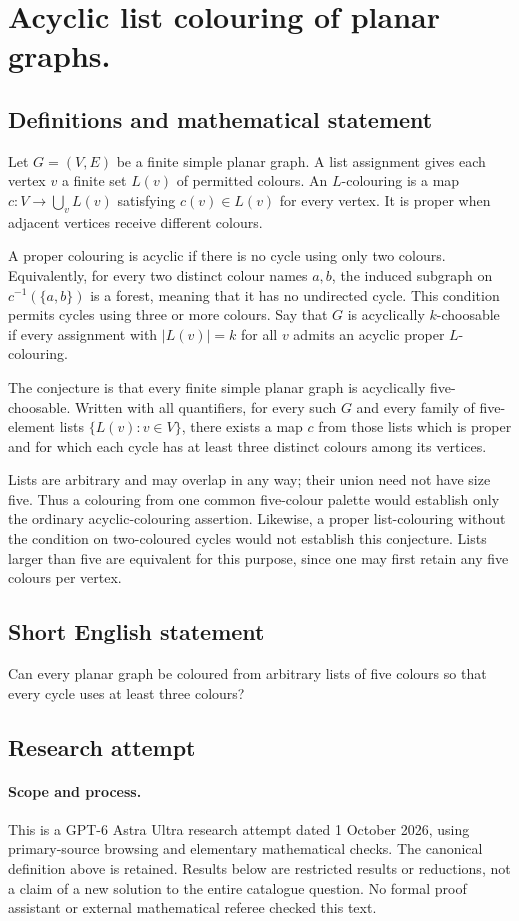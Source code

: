 \documentclass[11pt,a4paper]{article}
\begin{document}
\section*{Acyclic list colouring of planar graphs.}\label{statement}

\subsection{Definitions and mathematical statement}
Let $G=(V,E)$ be a finite simple planar graph. A list assignment gives each
vertex $v$ a finite set $L(v)$ of permitted colours. An $L$-colouring is a
map $c:V\to\bigcup_vL(v)$ satisfying $c(v)\in L(v)$ for every vertex.
It is proper when adjacent vertices receive different colours.

A proper colouring is acyclic if there is no cycle using only two colours.
Equivalently, for every two distinct colour names $a,b$, the induced
subgraph on $c^{-1}(\{a,b\})$ is a forest, meaning that it has no
undirected cycle. This condition permits cycles using three or more
colours. Say that $G$ is acyclically $k$-choosable if every assignment with
$|L(v)|=k$ for all $v$ admits an acyclic proper $L$-colouring.

The conjecture is that every finite simple planar graph is acyclically
five-choosable. Written with all quantifiers, for every such $G$ and every
family of five-element lists $\{L(v):v\in V\}$, there exists a map $c$
from those lists which is proper and for which each cycle has at least
three distinct colours among its vertices.

Lists are arbitrary and may overlap in any way; their union need not
have size five. Thus a colouring from one common five-colour palette
would establish only the ordinary acyclic-colouring assertion. Likewise,
a proper list-colouring without the condition on two-coloured cycles
would not establish this conjecture. Lists larger than five are equivalent
for this purpose, since one may first retain any five colours per vertex.
\subsection{Short English statement}
Can every planar graph be coloured from arbitrary lists of five colours so that every cycle uses at least three colours?
\subsection{Research attempt}
\paragraph{Scope and process.}
This is a GPT-6 Astra Ultra research attempt dated 1 October 2026, using
primary-source browsing and elementary mathematical checks. The canonical
definition above is retained. Results below are restricted results or
reductions, not a claim of a new solution to the entire catalogue question.
No formal proof assistant or external mathematical referee checked this text.
\end{document}
